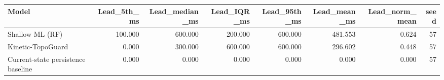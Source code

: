 \begin{tabular}{lrrrrrrr}
\toprule
Model & Lead\_5th\_ms & Lead\_median\_ms & Lead\_IQR\_ms & Lead\_95th\_ms & Lead\_mean\_ms & Lead\_norm\_mean & seed \\
\midrule
Shallow ML (RF) & 100.000 & 600.000 & 200.000 & 600.000 & 481.553 & 0.624 & 57 \\
Kinetic-TopoGuard & 0.000 & 300.000 & 600.000 & 600.000 & 296.602 & 0.448 & 57 \\
Current-state persistence baseline & 0.000 & 0.000 & 0.000 & 0.000 & 0.000 & 0.000 & 57 \\
\bottomrule
\end{tabular}